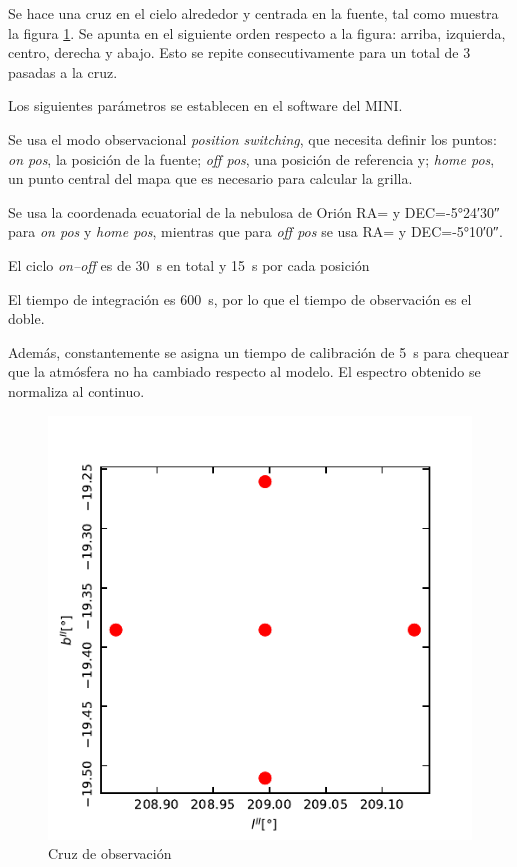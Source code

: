 Se hace una cruz en el cielo alrededor y centrada en la fuente, tal como muestra la figura \ref{fig:cruz}. Se apunta en el siguiente orden respecto a la figura: arriba, izquierda, centro, derecha y abajo. Esto se repite consecutivamente para un total de 3 pasadas a la cruz.

Los siguientes parámetros se establecen en el software del MINI.

Se usa el modo observacional \textit{position switching}, que necesita definir los puntos: \textit{on pos}, la posición de la fuente; \textit{off pos}, una posición de referencia y; \textit{home pos}, un punto central del mapa que es necesario para calcular la grilla.

Se usa la coordenada ecuatorial de la nebulosa de Orión RA= y DEC=\ang{-5;24;30} para \textit{on pos} y \textit{home pos}, mientras que para \textit{off pos} se usa RA= y DEC=\ang{-5;10;0}.

El ciclo \textit{on--off} es de \SI{30}{\second} en total y \SI{15}{\second} por cada posición

El tiempo de integración es \SI{600}{\second}, por lo que el tiempo de observación es el doble.

Además, constantemente se asigna un tiempo de calibración de \SI{5}{\second} para chequear que la atmósfera no ha cambiado respecto al modelo. El espectro obtenido se normaliza al continuo.

\begin{figure}[p]
	\centering
	\includegraphics{cruz.pdf}
	\caption{Cruz de observación}
	\label{fig:cruz}
\end{figure}

